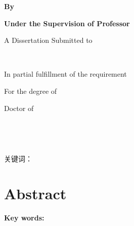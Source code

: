 {\begin{titlepage}
\begin{center}
      \vspace*{2.30cm} {\xiaosan\bf By}

      \vspace*{0.15cm} {\xiaosan\bf \@eauthor}

      \vspace*{0.70cm} {\xiaosan\bf Under the Supervision of Professor}

      \vspace*{0.15cm} {\xiaosan\bf \@esupervisor}
 
      \vspace*{3.00cm} {\xiaosan A Dissertation Submitted to}

      \vspace*{0.15cm} {\xiaosan ~~~~~~~~}      

      \vspace*{0.90cm} {\xiaosan In partial fulfillment of the requirement}

      \vspace*{0.15cm} {\xiaosan For the degree of}

      \vspace*{0.15cm} {\xiaosan Doctor of \bf \xueke}

      \vspace*{2.90cm} {\xiaosan ~~~~~~~}

      \vspace*{0.14cm} {\xiaosan \@edate}
    \end{center}
    \end{titlepage}

  \ifxueweidoctor
    \newpage
    ~~~\vspace{1em}
    \thispagestyle{empty}
  \fi
\clearpage


\setcounter{page}{1}
\song{}
\@cabstract
\vspace{\baselineskip}

\hangindent=52.3pt%
{\hei\xiaosi 关键词：} {\@ckeywords}

    
\clearpage

{}
  \chapter*{\textbf{Abstract}}
\@eabstract
\vspace{\baselineskip}

\hangindent=60pt\noindent
{\textbf{Key words:}}  \@ekeywords
}

